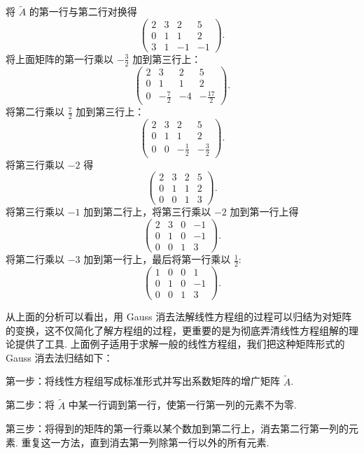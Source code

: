 \documentclass[UTF8, 12pt, fontset=fandol, oneside]{ctexart}
\begin{document}
将 $\widetilde{A}$ 的第一行与第二行对换得
\[
\left(\begin{array}{cccc}
2 & 3 & 2 & 5\\
0 & 1 & 1 & 2\\
3 & 1 & -1 & -1
\end{array}\right).
\]
将上面矩阵的第一行乘以 $-\frac{3}{2}$ 加到第三行上：
\[
\left(\begin{array}{cccc}
2 & 3 & 2 & 5\\
0 & 1 & 1 & 2\\
0 & -\frac{7}{2} & -4 & -\frac{17}{2}
\end{array}\right).
\]
将第二行乘以 $\frac{7}{2}$ 加到第三行上：
\[
\left(\begin{array}{cccc}
2 & 3 & 2 & 5\\
0 & 1 & 1 & 2\\
0 & 0 & -\frac{1}{2} & -\frac{3}{2}
\end{array}\right).
\]
将第三行乘以 $-2$ 得
\[
\left(\begin{array}{cccc}
2 & 3 & 2 & 5\\
0 & 1 & 1 & 2\\
0 & 0 & 1 & 3
\end{array}\right).
\]
将第三行乘以 $-1$ 加到第二行上，将第三行乘以 $-2$ 加到第一行上得
\[
\left(\begin{array}{cccc}
2 & 3 & 0 & -1\\
0 & 1 & 0 & -1\\
0 & 0 & 1 & 3
\end{array}\right).
\]
将第二行乘以 $-3$ 加到第一行上，最后将第一行乘以 $\frac{1}{2}$:
\[
\left(\begin{array}{cccc}
1 & 0 & 0 & 1\\
0 & 1 & 0 & -1\\
0 & 0 & 1 & 3
\end{array}\right).
\]

从上面的分析可以看出，用 Gauss 消去法解线性方程组的过程可以归结为对矩阵的变换，这不仅简化了解方程组的过程，更重要的是为彻底弄清线性方程组解的理论提供了工具. 上面例子适用于求解一般的线性方程组，我们把这种矩阵形式的 Gauss 消去法归结如下：

第一步：将线性方程组写成标准形式并写出系数矩阵的增广矩阵 $\widetilde{A}$.

第二步：将 $\widetilde{A}$ 中某一行调到第一行，使第一行第一列的元素不为零.

第三步：将得到的矩阵的第一行乘以某个数加到第二行上，消去第二行第一列的元素. 重复这一方法，直到消去第一列除第一行以外的所有元素.
\end{document}

